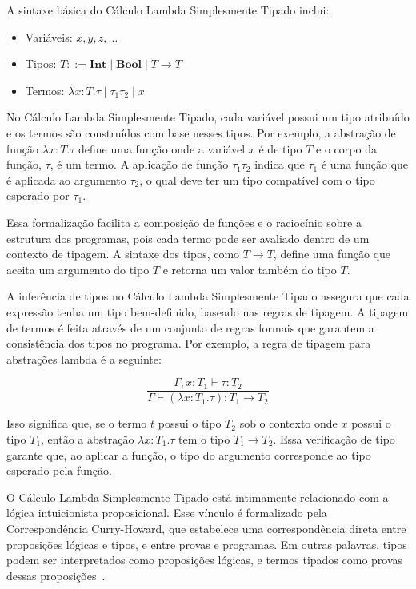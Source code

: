 A sintaxe básica do Cálculo Lambda Simplesmente Tipado inclui:

\begin{itemize}
  \item Variáveis: $x, y, z, \ldots$
  \item Tipos: $T ::= \mathbf{Int} \mid \mathbf{Bool} \mid T \to T$
  \item Termos: $\lambda x:T. \tau \mid \tau_1 \tau_2 \mid x$
\end{itemize}

No Cálculo Lambda Simplesmente Tipado, cada variável possui um tipo atribuído e os termos são construídos com base nesses tipos.
Por exemplo, a abstração de função $\lambda x:T. \tau$ define uma função onde a variável $x$ é de tipo $T$ e o corpo da função, $\tau$, é um termo.
A aplicação de função $\tau_1 \tau_2$ indica que $\tau_1$ é uma função que é aplicada ao argumento $\tau_2$, o qual deve ter um tipo compatível com o tipo esperado por $\tau_1$.

Essa formalização facilita a composição de funções e o raciocínio sobre a estrutura dos programas, pois cada termo pode ser avaliado dentro de um contexto de tipagem.
A sintaxe dos tipos, como $T \to T$, define uma função que aceita um argumento do tipo $T$ e retorna um valor também do tipo $T$.

A inferência de tipos no Cálculo Lambda Simplesmente Tipado assegura que cada expressão tenha um tipo bem-definido, baseado nas regras de tipagem.
A tipagem de termos é feita através de um conjunto de regras formais que garantem a consistência dos tipos no programa.
Por exemplo, a regra de tipagem para abstrações lambda é a seguinte:

\[
  \frac{\Gamma, x:T_1 \vdash \tau:T_2}{\Gamma \vdash (\lambda x:T_1. \tau): T_1 \to T_2}
\]

Isso significa que, se o termo $t$ possui o tipo $T_2$ sob o contexto onde $x$ possui o tipo $T_1$, então a abstração $\lambda x:T_1. \tau$ tem o tipo $T_1 \to T_2$.
Essa verificação de tipo garante que, ao aplicar a função, o tipo do argumento corresponde ao tipo esperado pela função.

O Cálculo Lambda Simplesmente Tipado está intimamente relacionado com a lógica intuicionista proposicional.
Esse vínculo é formalizado pela Correspondência Curry-Howard, que estabelece uma correspondência direta entre proposições lógicas e tipos, e entre provas e programas.
Em outras palavras, tipos podem ser interpretados como proposições lógicas, e termos tipados como provas dessas proposições~\cite{pierce2002types}.

